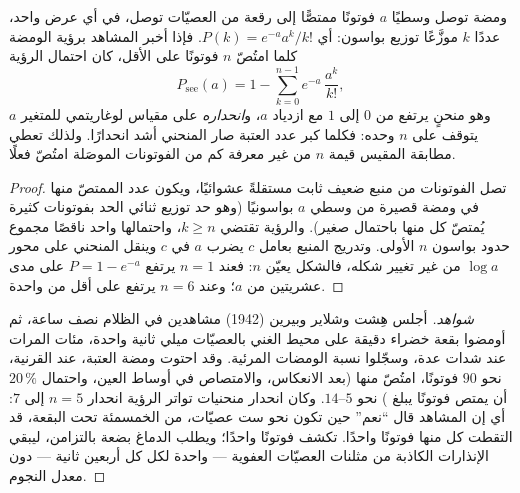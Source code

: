 \begin{theorem}\label{thm:b3:sensory-systems:hecht}
ومضة توصل وسطيًا $a$ فوتونًا ممتصًّا إلى رقعة من العصيّات
توصل، في أي عرض واحد، عددًا $k$ موزَّعًا توزيع بواسون: أي
$P(k) = e^{-a}a^{k}/k!$. فإذا أخبر المشاهد برؤية الومضة كلما
امتُصّ $n$ فوتونًا على الأقل، كان احتمال الرؤية
\[
P_{\text{see}}(a) = 1 - \sum_{k=0}^{n-1} e^{-a}\,\frac{a^{k}}{k!} ,
\]
وهو منحنٍ يرتفع من $0$ إلى $1$ مع ازدياد $a$،
و\emph{انحداره} على مقياس لوغاريتمي للمتغير $a$ يتوقف على $n$
وحده: فكلما كبر عدد العتبة صار المنحني أشد انحدارًا. ولذلك
تعطي مطابقة  المقيس قيمة $n$ من غير معرفة
كم من الفوتونات الموصَلة امتُصّ فعلًا.
\end{theorem}
\begin{proof}
تصل الفوتونات من منبع ضعيف ثابت مستقلةً عشوائيًا، ويكون عدد
الممتصّ منها في ومضة قصيرة من وسطي $a$ بواسونيًا (وهو حد
توزيع ثنائي الحد بفوتونات كثيرة يُمتصّ كل منها باحتمال
صغير). والرؤية تقتضي $k \ge n$، واحتمالها واحد ناقصًا مجموع
حدود بواسون $n$ الأولى. وتدريج المنبع بعامل $c$ يضرب $a$
في $c$ وينقل المنحني على محور $\log a$ من غير تغيير شكله،
فالشكل يعيّن $n$: فعند $n =
1$ يرتفع $P = 1 - e^{-a}$ على مدى عشريتين من $a$؛ وعند
$n = 6$ يرتفع على أقل من واحدة.
\end{proof}

\begin{proof}[شواهد]
أجلس هِشت وشلاير وبيرين (1942) مشاهدين في الظلام نصف ساعة،
ثم أومضوا بقعة خضراء دقيقة على محيط  الغني بالعصيّات
ميلي ثانية واحدة، مئات المرات عند شدات عدة، وسجّلوا نسبة
الومضات المرئية. وقد احتوت ومضة العتبة، عند القرنية، نحو
$90$ فوتونًا، امتُصّ منها (بعد الانعكاس، والامتصاص في أوساط
العين، واحتمال $20\,\%$ أن يمتص  فوتونًا يبلغ
) نحو $5$--$14$. وكان انحدار منحنيات تواتر الرؤية
انحدار $n = 5$ إلى $7$: أي إن المشاهد قال ``نعم'' حين تكون
نحو ست عصيّات، من الخمسمئة تحت البقعة، قد التقطت كل منها
فوتونًا واحدًا.  تكشف فوتونًا واحدًا؛ ويطلب الدماغ
بضعة بالتزامن، ليبقي الإنذارات الكاذبة من مثلنات العصيّات
العفوية --- واحدة لكل  كل أربعين ثانية --- دون معدل
النجوم.
\end{proof}

